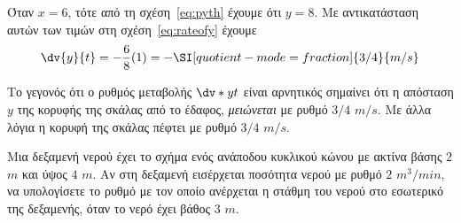 \documentclass[a4paper,table]{report}
\begin{document}
\begin{solution}
    Όταν $x=6$, τότε από τη σχέση~\eqref{eq:pyth} έχουμε ότι $y=8$. Με αντικατάσταση 
    αυτών των τιμών στη σχέση~\eqref{eq:rateofy} έχουμε
    \[
      \dv{y}{t} = -\frac{6}{8}(1) = -\SI[quotient-mode=fraction]{3/4}{m/s}
    \]

    Το γεγονός ότι ο ρυθμός μεταβολής $\dv*{y}{t}$ είναι αρνητικός σημαίνει
    ότι η απόσταση $y$ της κορυφής της σκάλας από το έδαφος,
    \emph{μειώνεται} με ρυθμό ${3}/{4}$ $\si{m\per s}$. Με άλλα λόγια η
    κορυφή της σκάλας πέφτει με ρυθμό ${3}/{4}$ $\si{m\per s}$.
  \end{solution}

  \begin{mybox3}
    \begin{problem}
      Μια δεξαμενή νερού έχει το σχήμα ενός ανάποδου
      κυκλικού κώνου με ακτίνα βάσης $2$ $\si{m}$ και ύψος $4$ $\si{m}.$ Αν
      στη δεξαμενή εισέρχεται ποσότητα νερού με ρυθμό $2$ $\si{m^{3}/min}$, να
      υπολογίσετε το ρυθμό με τον οποίο ανέρχεται η στάθμη του νερού στο εσωτερικό της
      δεξαμενής, όταν το νερό έχει βάθος $3$ $\si{m}$.
    \end{problem}
  \end{mybox3}
\end{document}
